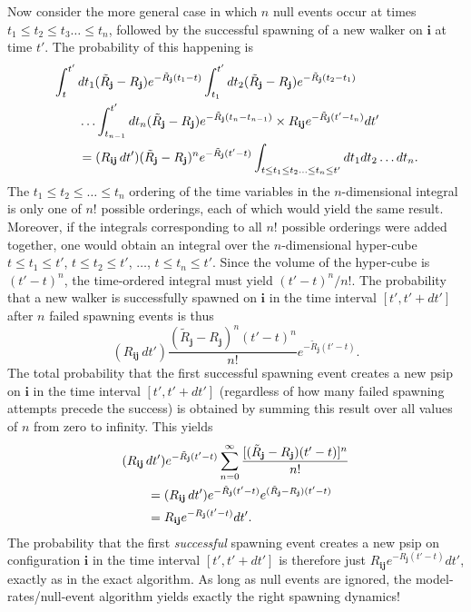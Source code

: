 \documentclass[a4paper, 11pt]{article}
\newcommand{\bi}{\mathbf{i}}
\newcommand{\bj}{\mathbf{j}}
\begin{document}
Now consider the more general case in which $n$ null events occur at
times $t_1 \leq t_2 \leq t_3 \ldots \leq t_n$, followed by the
successful spawning of a new walker on $\bi$ at time $t'$. The
probability of this happening is
\begin{align*}
\MoveEqLeft \int_{t}^{t'} dt_1 (\tilde{R}_{\bj} - R_{\bj})
e^{-\tilde{R}_{\bj}(t_1 - t)} \int_{t_1}^{t'} dt_2
(\tilde{R}_{\bj} - R_{\bj}) e^{-\tilde{R}_{\bj}(t_2 - t_1)} \\
& \ldots \int_{t_{n-1}}^{t'} dt_n
(\tilde{R}_{\bj} - R_{\bj}) e^{-\tilde{R}_{\bj}(t_n - t_{n-1})}
\times R_{\bi\bj} e^{-\tilde{R}_{\bj}(t'-t_n)} dt' \\
& = ( R_{\bi\bj} \, dt' ) ( \tilde{R}_{\bj} - R_{\bj}
)^{n} e^{-\tilde{R}_{\bj}(t'-t)} \int_{t \leq t_1 \leq t_2 \ldots \leq
  t_n \leq t'} dt_1 dt_2 \ldots dt_n.
\end{align*}
The $t_1 \leq t_2 \leq \ldots \leq t_n$ ordering of the time variables
in the $n$-dimensional integral is only one of $n!$ possible orderings,
each of which would yield the same result. Moreover, if the integrals
corresponding to all $n!$ possible orderings were added together, one
would obtain an integral over the $n$-dimensional hyper-cube $t \leq t_1
\leq t'$, $t \leq t_2 \leq t'$, $\ldots$, $t \leq t_n \leq t'$.  Since
the volume of the hyper-cube is $(t'-t)^{n}$, the time-ordered integral
must yield $(t'-t)^n/n!$. The probability that a new walker is
successfully spawned on $\bi$ in the time interval $[t',t'+dt']$ after
$n$ failed spawning events is thus
\begin{equation*}
(R_{\bi\bj}\,dt')  \frac{(\tilde{R}_{\bj} - R_{\bj})^n (t'-t)^n}{n!} 
e^{-\tilde{R}_{\bj}(t'-t)} .
\end{equation*}
The total probability that the first successful spawning event creates a
new psip on $\bi$ in the time interval $[t',t'+dt']$ (regardless of how
many failed spawning attempts precede the success) is obtained by
summing this result over all values of $n$ from zero to infinity. This
yields
\begin{align*}
\MoveEqLeft (R_{\bi\bj}\,dt') e^{-\tilde{R}_{\bj}(t'-t)} \sum_{n=0}^{\infty}
\frac{[(\tilde{R}_{\bj} - R_{\bj})(t'-t)]^n}{n!} \\
& = (R_{\bi\bj}\,dt') e^{-\tilde{R}_{\bj}(t'-t)}
e^{(\tilde{R}_{\bj}-R_{\bj})(t'-t)} \\
& = R_{\bi\bj} e^{-R_{\bj}(t'-t)} dt' .
\end{align*}
The probability that the first \emph{successful} spawning event creates
a new psip on configuration $\bi$ in the time interval $[t',t'+dt']$ is
therefore just $R_{\bi\bj} e^{-R_{\bj}(t'-t)} dt'$, exactly as in the
exact algorithm. As long as null events are ignored, the
model-rates/null-event algorithm yields exactly the right spawning
dynamics!
\end{document}
